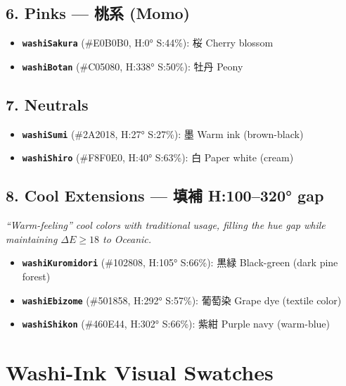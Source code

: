 \subsection*{6. Pinks --- 桃系 (Momo)}
\begin{itemize}
    \item \textbf{\texttt{washiSakura}} (\#E0B0B0, H:0° S:44\%): 桜 Cherry blossom
    \item \textbf{\texttt{washiBotan}} (\#C05080, H:338° S:50\%): 牡丹 Peony
\end{itemize}

\subsection*{7. Neutrals}
\begin{itemize}
    \item \textbf{\texttt{washiSumi}} (\#2A2018, H:27° S:27\%): 墨 Warm ink (brown-black)
    \item \textbf{\texttt{washiShiro}} (\#F8F0E0, H:40° S:63\%): 白 Paper white (cream)
\end{itemize}

\subsection*{8. Cool Extensions --- 填補 H:100--320° gap}
\textit{``Warm-feeling'' cool colors with traditional usage, filling the hue gap while maintaining $\Delta E \geq 18$ to Oceanic.}
\begin{itemize}
    \item \textbf{\texttt{washiKuromidori}} (\#102808, H:105° S:66\%): 黒緑 Black-green (dark pine forest)
    \item \textbf{\texttt{washiEbizome}} (\#501858, H:292° S:57\%): 葡萄染 Grape dye (textile color)
    \item \textbf{\texttt{washiShikon}} (\#460E44, H:302° S:66\%): 紫紺 Purple navy (warm-blue)
\end{itemize}

\section{Washi-Ink Visual Swatches}

